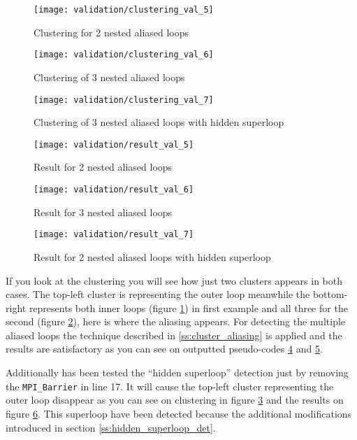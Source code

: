\begin{multicols}{3}
  \begin{figure}[H]
    \centering
    \texttt{[image: validation/clustering\_val\_5]}
    \caption{Clustering for 2 nested aliased loops}
    \label{fig:clustering_val_5}
  \end{figure}
  \columnbreak
  \begin{figure}[H]
    \centering
    \texttt{[image: validation/clustering\_val\_6]}
    \caption{Clustering of 3 nested aliased loops}
    \label{fig:clustering_val_6}
  \end{figure}
  \columnbreak
  \begin{figure}[H]
    \centering
    \texttt{[image: validation/clustering\_val\_7]}
    \caption{Clustering of 3 nested aliased loops with hidden superloop}
    \label{fig:clustering_val_7}
  \end{figure}
\end{multicols}

\begin{figure}[H]
    \centering
    \texttt{[image: validation/result\_val\_5]}
    \caption{Result for 2 nested aliased loops}
    \label{fig:result_val_5}
\end{figure}
\begin{figure}[H]
    \centering
    \texttt{[image: validation/result\_val\_6]}
    \caption{Result for 3 nested aliased loops}
    \label{fig:result_val_6}
\end{figure}
\begin{figure}[H]
    \centering
    \texttt{[image: validation/result\_val\_7]}
    \caption{Result for 2 nested aliased loops with hidden superloop}
    \label{fig:result_val_7}
\end{figure}

If you look at the clustering you will see how just two clusters appears in both
cases. The top-left cluster is representing the outer loop meanwhile the bottom-right
represents both inner loops (figure \ref{fig:clustering_val_5}) in first example 
and all three for the second (figure \ref{fig:clustering_val_6}), here is where 
the aliasing appears. For detecting the multiple aliased loops the technique
described in \ref{ss:cluster_aliasing} is applied and the results are
satisfactory as you can see on outputted pseudo-codes \ref{fig:result_val_5} and
\ref{fig:result_val_6}.

Additionally has been tested the ``hidden superloop'' detection just by
removing the \texttt{MPI\_Barrier} in line 17. It will cause the top-left
cluster representing the outer loop disappear as you can see on clustering in
figure \ref{fig:clustering_val_7} and the results on figure
\ref{fig:result_val_7}. This superloop have been detected because the
additional modifications introduced in section \ref{ss:hidden_superloop_det}.

